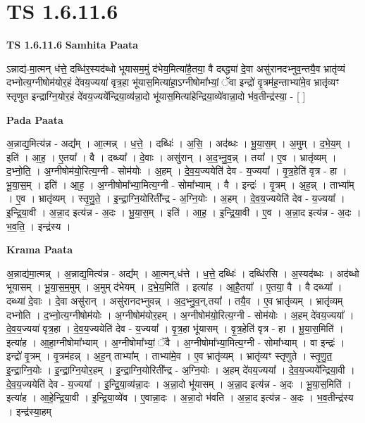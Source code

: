 \documentclass[17pt]{extarticle}
\begin{document}
\section*{ TS 1.6.11.6 }

\textbf{TS 1.6.11.6 } \newline
\textbf{Samhita Paata} \newline

ऽन्नाद्य॑-मा॒त्मन् ध॑त्ते॒ दब्धि॑र॒स्यद॑ब्धो भूयासम॒मुं द॑भेय॒मित्या॑है॒तया॒ वै दब्द्ध्या॑ दे॒वा असु॑रानदभ्नुव॒न्तयै॒व भ्रातृ॑व्यं दभ्नोत्य॒ग्नीषोम॑योर॒हं दे॑वय॒ज्यया॑ वृत्र॒हा भू॑यास॒मित्या॑हा॒ऽग्नीषोमा᳚भ्यां॒ ॅवा इन्द्रो॑ वृ॒त्रम॑ह॒न्ताभ्या॑मे॒व भ्रातृ॑व्यꣳ स्तृणुत इन्द्राग्नि॒योर॒हं दे॑वय॒ज्यये᳚न्द्रिया॒व्य॑न्ना॒दो भू॑यास॒मित्या॑हेन्द्रिया॒व्ये॑वान्ना॒दो भ॑व॒तीन्द्र॑स्या॒ - [ ] \newline

\textbf{Pada Paata} \newline

अ॒न्नाद्य॒मित्य॑न्न - अद्य᳚म् । आ॒त्मन्न् । ध॒त्ते॒ । दब्धिः॑ । अ॒सि॒ । अद॑ब्धः । भू॒या॒स॒म् । अ॒मुम् । द॒भे॒य॒म् । इति॑ । आ॒ह॒ । ए॒तया᳚ । वै । दब्ध्या᳚ । दे॒वाः । असु॑रान् । अ॒द॒भ्नु॒व॒॒न्न् । तया᳚ । ए॒व । भ्रातृ॑व्यम् । द॒भ्नो॒ति॒ । अ॒ग्नीषोम॑यो॒रित्य॒ग्नी - सोम॑योः । अ॒हम् । दे॒व॒य॒ज्ययेति॑ देव - य॒ज्यया᳚ । वृ॒त्र॒हेति॑ वृत्र - हा । भू॒या॒स॒म् । इति॑ । आ॒ह॒ । अ॒ग्नीषोमा᳚भ्या॒मित्य॒ग्नी - सोमा᳚भ्याम् । वै । इन्द्रः॑ । वृ॒त्रम् । अ॒ह॒न्न् । ताभ्या᳚म् । ए॒व । भ्रातृ॑व्यम् । स्तृ॒णु॒ते॒ । इ॒न्द्रा॒ग्नि॒योरिती᳚न्द्र - अ॒ग्नि॒योः । अ॒हम् । दे॒व॒य॒ज्ययेति॑ देव - य॒ज्यया᳚ । इ॒न्द्रि॒या॒वी । अ॒न्ना॒द इत्य॑न्न - अ॒दः । भू॒या॒स॒म् । इति॑ । आ॒ह॒ । इ॒न्द्रि॒या॒वी । ए॒व । अ॒न्ना॒द इत्य॑न्न - अ॒दः । भ॒व॒ति॒ । इन्द्र॑स्य ।  \newline


\textbf{Krama Paata} \newline

अ॒न्नाद्य॑मा॒त्मन्न् । अ॒न्नाद्य॒मित्य॑न्न - अद्य᳚म् । आ॒त्मन्,ध॑त्ते । ध॒त्ते॒ दब्धिः॑ । दब्धि॑रसि । अ॒स्यद॑ब्धः । अद॑ब्धो भूयासम् । भू॒या॒स॒म॒मुम् । अ॒मुम् द॑भेयम् । द॒भे॒य॒मिति॑ । इत्या॑ह । आ॒है॒तया᳚ । ए॒तया॒ वै । वै दब्ध्या᳚ । दब्ध्या॑ दे॒वाः । दे॒वा असु॑रान् । असु॑रानदभ्नुवन्न् । अ॒द॒भ्नु॒व॒न्,तया᳚ । तयै॒व । ए॒व भ्रातृ॑व्यम् । भ्रातृ॑व्यम् दभ्नोति । द॒भ्नो॒त्य॒ग्नीषोम॑योः । अ॒ग्नीषोम॑योर॒हम् । अ॒ग्नीषोम॑यो॒रित्य॒ग्नी - सोम॑योः । अ॒हम् दे॑वय॒ज्यया᳚ । दे॒व॒य॒ज्यया॑ वृत्र॒हा । दे॒व॒य॒ज्ययेति॑ देव - य॒ज्यया᳚ । वृ॒त्र॒हा भू॑यासम् । वृ॒त्र॒हेति॑ वृत्र - हा । भू॒या॒स॒मिति॑ । इत्या॑ह । आ॒हा॒ग्नीषोमा᳚भ्याम् । अ॒ग्नीषोमा᳚भ्यां॒ ॅवै । अ॒ग्नीषोमा᳚भ्या॒मित्य॒ग्नी - सोमा᳚भ्याम् । वा इन्द्रः॑ । इन्द्रो॑ वृ॒त्रम् । वृ॒त्रम॑हन्न् । अ॒ह॒न् ताभ्या᳚म् । ताभ्या॑मे॒व । ए॒व भ्रातृ॑व्यम् । भ्रातृ॑व्यꣳ स्तृणुते । स्तृ॒णु॒त॒ इ॒न्द्रा॒ग्नि॒योः । इ॒न्द्रा॒ग्नि॒योर॒हम् । इ॒न्द्रा॒ग्नि॒योरिती᳚न्द्र - अ॒ग्नि॒योः । अ॒हम् दे॑वय॒ज्यया᳚ । दे॒व॒य॒ज्यये᳚न्द्रिया॒वी । दे॒व॒य॒ज्ययेति॑ देव - य॒ज्यया᳚ । इ॒न्द्रि॒या॒व्य॑न्ना॒दः । अ॒न्ना॒दो भू॑यासम् । अ॒न्ना॒द इत्य॑न्न - अ॒दः । भू॒या॒स॒मिति॑ । इत्या॑ह । आ॒हे॒न्द्रि॒या॒वी । इ॒न्द्रि॒या॒व्ये॑व । ए॒वान्ना॒दः । अ॒न्ना॒दो भ॑वति । अ॒न्ना॒द इत्य॑न्न - अ॒दः । भ॒व॒तीन्द्र॑स्य । इन्द्र॑स्या॒हम् \newline
\end{document}
